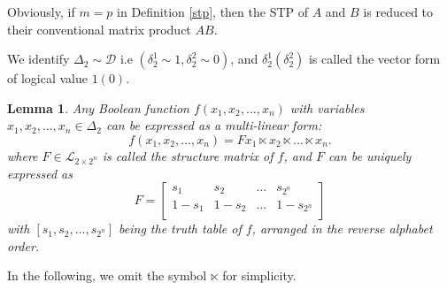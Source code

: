 \documentclass[conference]{IEEEtran}
\newtheorem{lemma}{Lemma}
\begin{document}
Obviously, if $m=p$ in Definition \ref{stp}, then the STP of $A$ and $B$ is reduced to their conventional matrix product $AB$.

We identify $\Delta_{2}\sim \mathcal{D}$ i.e $(\delta^1_2\sim 1,\delta^2_2\sim 0)$, and $\delta^1_2(\delta^2_2)$ is called the vector form of logical value $1(0)$.

\begin{lemma}\label{lemma1}\cite{Cheng2011Analysis}
Any Boolean function $f(x_1,x_2,...,x_n)$ with variables $x_1,x_2,...,x_n\in \Delta_2$ can be expressed as a multi-linear form:
\begin{equation}
f(x_1,x_2,...,x_n)=Fx_1\ltimes x_2\ltimes ...\ltimes x_n.
\end{equation}
where $F\in \mathcal{L}_{2\times 2^n}$ is called the \textit{structure matrix} of $f$, and $F$ can be uniquely expressed as
\begin{equation}
F=\left[
    \begin{array}{cccc}
      s_1 & s_2 & ... & s_{2^{n}} \\
      1-s_1 & 1-s_2 & ... & 1-s_{2^n} \\
    \end{array}
  \right]
\end{equation}
with $[s_1,s_2,...,s_{2^n}]$ being the truth table of $f$, arranged in the reverse alphabet order.
\end{lemma}

In the following, we omit the symbol $\ltimes$ for simplicity.
\end{document}
